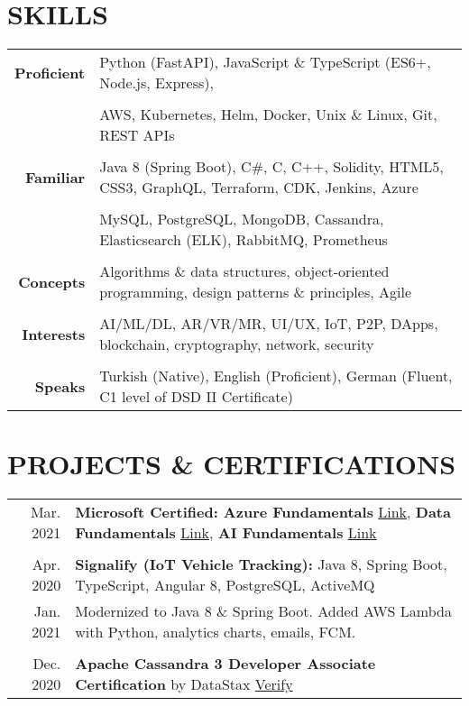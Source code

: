 \documentclass[a4paper, 10pt]{article}
\begin{document}
\section{SKILLS}
{\renewcommand{\arraystretch}{0.7}
\begin{tabular}{r p{15.4cm}}
    \textbf{Proficient} & Python (FastAPI), JavaScript \& TypeScript (ES6+, Node.js, Express),\\\\
    & AWS, Kubernetes, Helm, Docker, Unix \& Linux, Git, REST APIs\\\\
    \textbf{Familiar} & Java 8 (Spring Boot), C\#, C, C++, Solidity, HTML5, CSS3, GraphQL, Terraform, CDK, Jenkins, Azure\\\\
    & MySQL, PostgreSQL, MongoDB, Cassandra, Elasticsearch (ELK), RabbitMQ, Prometheus\\\\
    \textbf{Concepts} & Algorithms \& data structures, object-oriented programming, design patterns \& principles, Agile\\\\
    \textbf{Interests} & AI/ML/DL, AR/VR/MR, UI/UX, IoT, P2P, DApps, blockchain, cryptography, network, security\\\\
    \textbf{Speaks} & Turkish (Native), English (Proficient), German (Fluent, C1 level of DSD II Certificate)
\end{tabular}}

\section{PROJECTS \& CERTIFICATIONS}
\begin{tabular}{r p{15.7cm}}
    Mar. 2021 & \textbf{Microsoft Certified: Azure Fundamentals} \href{https://www.credly.com/badges/18da888a-9cbd-49d8-b923-7c7fe752fbab}{Link}, \textbf{Data Fundamentals} \href{https://www.credly.com/badges/3cc1890b-1881-48c4-9c25-d960e14fbdee}{Link}, \textbf{AI Fundamentals} \href{https://www.credly.com/badges/b96505f9-33f9-47e0-91bd-2c8fd73ecffb}{Link}\\\\
    Apr. 2020 &  \textbf{Signalify (IoT Vehicle Tracking):} Java 8, Spring Boot, TypeScript, Angular 8, PostgreSQL, ActiveMQ\\
    Jan. 2021 & Modernized to Java 8 \& Spring Boot. Added AWS Lambda with Python, analytics charts, emails, FCM.\\\\
    Dec. 2020 & \textbf{Apache Cassandra 3 Developer Associate Certification} by DataStax \hspace{0.5em} \href{https://certification.mettl.com/datastax/applicant/result/download-certificate?key=v2gAI\%2BtQJaGeWin6S7cSag\%3D\%3D}{Verify}
\end{tabular}
\end{document}
